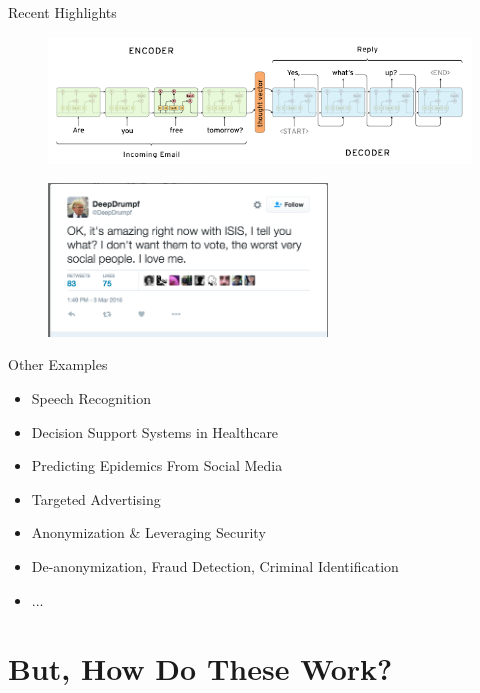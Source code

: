 \documentclass{beamer}
\begin{document}
\begin{frame}{Recent Highlights}
		\begin{figure}
	  		\vspace*{-0.4cm}
	  		\hspace*{-0.5cm}
			\centering
			\includegraphics[trim = 0mm 0mm 0mm 0mm, clip, width=11.5cm]{chatbot1.png}
			\label{fig:res4}
		\end{figure}
				\begin{figure}
	  		\vspace*{-0.1cm}
			\centering
			\includegraphics[trim = 5mm 5mm 5mm 5mm, clip, width=7.4cm]{chatbot3.png}
			\label{fig:res4}
		\end{figure}
\end{frame}

\begin{frame}{Other Examples}
\begin{itemize}
\item{Speech Recognition} \pause
\item{Decision Support Systems in Healthcare} \pause
\item{Predicting Epidemics From Social Media} \pause
\item{Targeted Advertising} \pause
\item{Anonymization \& Leveraging Security} \pause
\item{De-anonymization, Fraud Detection, Criminal Identification} \pause
\item{...} 
\end{itemize}
\end{frame}

\section{But, How Do These Work?}
\end{document}
